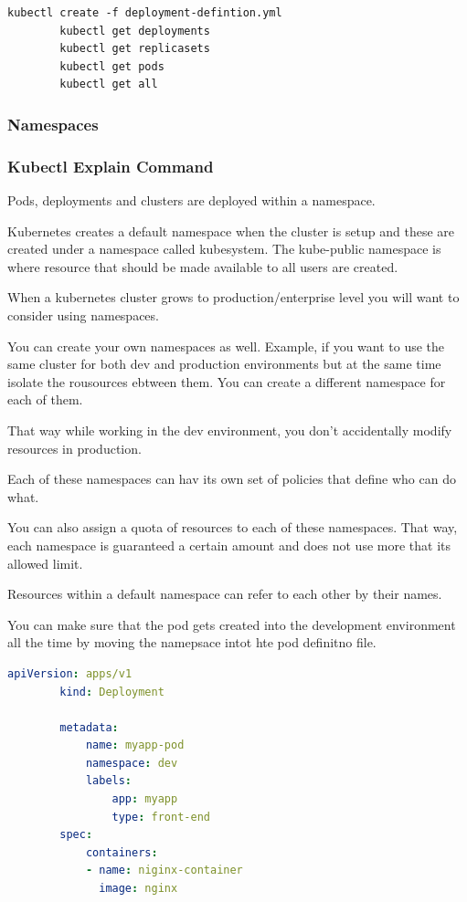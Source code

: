 \documentclass[11pt]{book}
\begin{document}
    \begin{lstlisting}[language=terminal,caption={Pod commands}]
        kubectl create -f deployment-defintion.yml
        kubectl get deployments
        kubectl get replicasets
        kubectl get pods
        kubectl get all
    \end{lstlisting}

    \subsubsection{Namespaces}

    \subsubsection{Kubectl Explain Command}
    Pods, deployments and clusters are deployed within a namespace.

    Kubernetes creates a default namespace when the cluster is setup and these are created under a namespace called kubesystem.
    The kube-public namespace is where resource that should be made available to all users are created.

    When a kubernetes cluster grows to production/enterprise level you will want to consider using namespaces.

    You can create your own namespaces as well.
    Example, if you want to use the same cluster for both dev and production environments but at the same time isolate the rousources ebtween them.
    You can create a different namespace for each of them.

    That way while working in the dev environment, you don't accidentally modify resources in production.

    Each of these namespaces can hav its own set of policies that define who can do what.

    You can also assign a quota of resources to each of these namespaces.
    That way, each namespace is guaranteed a certain amount and does not use more that its allowed limit.

    Resources within a default namespace can refer to each other by their names.

    You can make sure that the pod gets created into the development environment all the time by moving the namepsace intot hte pod definitno file.

    \begin{lstlisting}[language=yaml, caption={Replication Set}]
        apiVersion: apps/v1
        kind: Deployment

        metadata:
            name: myapp-pod
            namespace: dev
            labels:
                app: myapp
                type: front-end
        spec:
            containers:
            - name: niginx-container
              image: nginx
    \end{lstlisting}
\end{document}

